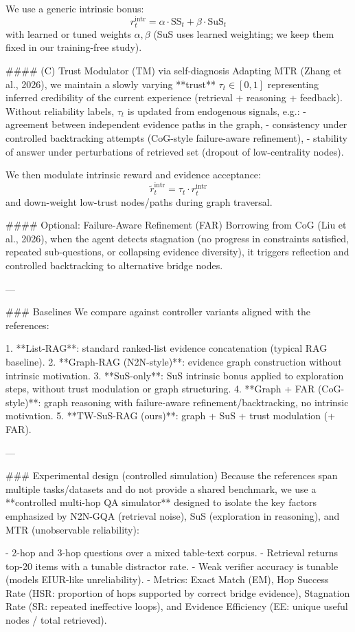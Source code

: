 We use a generic intrinsic bonus:
\[
r^{\text{intr}}_t = \alpha \cdot \text{SS}_t + \beta \cdot \text{SuS}_t
\]
with learned or tuned weights \(\alpha,\beta\) (SuS uses learned weighting; we keep them fixed in our training-free study).

#### (C) Trust Modulator (TM) via self-diagnosis  
Adapting MTR (Zhang et al., 2026), we maintain a slowly varying **trust** \( \tau_t \in [0,1] \) representing inferred credibility of the current experience (retrieval + reasoning + feedback). Without reliability labels, \(\tau_t\) is updated from endogenous signals, e.g.:
- agreement between independent evidence paths in the graph,
- consistency under controlled backtracking attempts (CoG-style failure-aware refinement),
- stability of answer under perturbations of retrieved set (dropout of low-centrality nodes).

We then modulate intrinsic reward and evidence acceptance:
\[
\tilde r^{\text{intr}}_t = \tau_t \cdot r^{\text{intr}}_t
\]
and down-weight low-trust nodes/paths during graph traversal.

#### Optional: Failure-Aware Refinement (FAR)  
Borrowing from CoG (Liu et al., 2026), when the agent detects stagnation (no progress in constraints satisfied, repeated sub-questions, or collapsing evidence diversity), it triggers reflection and controlled backtracking to alternative bridge nodes.

---

### Baselines  
We compare against controller variants aligned with the references:

1. **List-RAG**: standard ranked-list evidence concatenation (typical RAG baseline).  
2. **Graph-RAG (N2N-style)**: evidence graph construction without intrinsic motivation.  
3. **SuS-only**: SuS intrinsic bonus applied to exploration steps, without trust modulation or graph structuring.  
4. **Graph + FAR (CoG-style)**: graph reasoning with failure-aware refinement/backtracking, no intrinsic motivation.  
5. **TW-SuS-RAG (ours)**: graph + SuS + trust modulation (+ FAR).

---

### Experimental design (controlled simulation)  
Because the references span multiple tasks/datasets and do not provide a shared benchmark, we use a **controlled multi-hop QA simulator** designed to isolate the key factors emphasized by N2N-GQA (retrieval noise), SuS (exploration in reasoning), and MTR (unobservable reliability):

- 2-hop and 3-hop questions over a mixed table-text corpus.
- Retrieval returns top-20 items with a tunable distractor rate.
- Weak verifier accuracy is tunable (models EIUR-like unreliability).
- Metrics: Exact Match (EM), Hop Success Rate (HSR: proportion of hops supported by correct bridge evidence), Stagnation Rate (SR: repeated ineffective loops), and Evidence Efficiency (EE: unique useful nodes / total retrieved).

